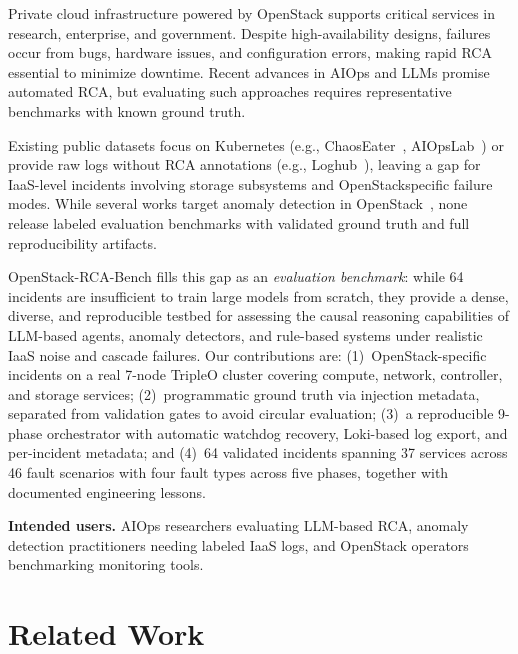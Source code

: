 \documentclass[sigconf,review]{acmart}
\begin{document}
Private cloud infrastructure powered by OpenStack supports critical services in research, enterprise, and government. Despite high-availability designs, failures occur from bugs, hardware issues, and configuration errors, making rapid RCA essential to minimize downtime. Recent advances in AIOps and LLMs promise automated RCA, but evaluating such approaches requires representative benchmarks with known ground truth.

{\sloppy Existing public datasets focus on Kubernetes (e.g., ChaosEater~\cite{chaoseater}, AIOpsLab~\cite{aiopslab}) or provide raw logs without RCA annotations (e.g., Loghub~\cite{loghub}), leaving a gap for IaaS-level incidents involving storage subsystems and Open\-Stack\-spe\-cif\-ic failure modes. While several works target anomaly detection in Open\-Stack~\cite{cotroneo,nedelkoski}\allowbreak\cite{kalaki,rajkarnikar}, none release labeled evaluation benchmarks with validated ground truth and full reproducibility artifacts.}

OpenStack-RCA-Bench fills this gap as an \textit{evaluation benchmark}: while 64 incidents are insufficient to train large models from scratch, they provide a dense, diverse, and reproducible testbed for assessing the causal reasoning capabilities of LLM-based agents, anomaly detectors, and rule-based systems under realistic IaaS noise and cascade failures. Our contributions are: (1)~OpenStack-specific incidents on a real 7-node TripleO cluster covering compute, network, controller, and storage services; (2)~programmatic ground truth via injection metadata, separated from validation gates to avoid circular evaluation; (3)~a reproducible 9-phase orchestrator with automatic watchdog recovery, Loki-based log export, and per-incident metadata; and (4)~64 validated incidents spanning 37 services across 46 fault scenarios with four fault types across five phases, together with documented engineering lessons.

\textbf{Intended users.} AIOps researchers evaluating LLM-based RCA, anomaly detection practitioners needing labeled IaaS logs, and OpenStack operators benchmarking monitoring tools.

\section{Related Work}
\label{sec:related}
\end{document}
